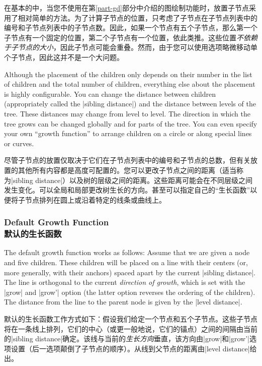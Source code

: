 在基本的\tikzname 中，当您不使用在第\ref{part-gd}部分中介绍的图绘制功能时，放置子节点采用了相对简单的方法。为了计算子节点的位置，只考虑了子节点在子节点列表中的编号和子节点列表中的子节点数。因此，如果一个节点有五个子节点，那么第一个子节点有一个固定的位置，第二个子节点有一个位置，依此类推。这些位置\emph{不依赖于子节点的大小}，因此子节点可能会重叠。然而，由于您可以使用选项略微移动单个子节点，因此这并不是一个大问题。

Although the placement of the children only depends on their number in the list
of children and the total number of children, everything else about the
placement is highly configurable. You can change the distance between children
(appropriately called the |sibling distance|) and the distance between levels
of the tree. These distances may change from level to level. The direction in
which the tree grows can be changed globally and for parts of the tree. You can
even specify your own ``growth function'' to arrange children on a circle or
along special lines or curves.

尽管子节点的放置仅取决于它们在子节点列表中的编号和子节点的总数，但有关放置的其他所有内容都是高度可配置的。您可以更改子节点之间的距离（适当称为|sibling distance|）以及树的层级之间的距离。这些距离可能会在不同层级之间发生变化。可以全局和局部更改树生长的方向。甚至可以指定自己的“生长函数”以便将子节点排列在圆上或沿着特定的线条或曲线上。


\subsubsection{Default Growth Function\\默认的生长函数}

The default growth function works as follows: Assume that we are given a node
and five children. These children will be placed on a line with their centers
(or, more generally, with their anchors) spaced apart by the current
|sibling distance|. The line is orthogonal to the current \emph{direction of
growth}, which is set with the |grow| and |grow'| option (the latter option
reverses the ordering of the children). The distance from the line to the
parent node is given by the |level distance|.

默认的生长函数工作方式如下：假设我们给定一个节点和五个子节点。这些子节点将在一条线上排列，它们的中心（或更一般地说，它们的锚点）之间的间隔由当前的|sibling distance|确定。该线与当前的\emph{生长方向}垂直，该方向由|grow|和|grow'|选项设置（后一选项颠倒了子节点的顺序）。从线到父节点的距离由|level distance|给出。

